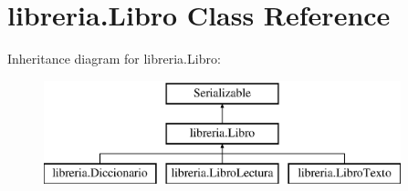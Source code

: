 \hypertarget{classlibreria_1_1_libro}{}\section{libreria.\+Libro Class Reference}
\label{classlibreria_1_1_libro}
Inheritance diagram for libreria.\+Libro\+:\begin{figure}[H]
\begin{center}
\leavevmode
\includegraphics[height=3.000000cm]{classlibreria_1_1_libro}
\end{center}
\end{figure}
